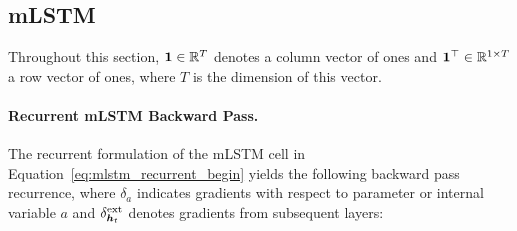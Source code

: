 \documentclass[dvipsnames]{article}
\begin{document}
\begin{appendix}
\subsection{mLSTM}
\label{sec:appmLSTM}

Throughout this section, $\bm{1} \in \mathbb{R}^{T}$ denotes a column vector of ones and $\bm{1}^\top \in \mathbb{R}^{1 \times T}$ a row vector of ones, where $T$ is the dimension of this vector.

\paragraph{Recurrent mLSTM Backward Pass.}
The recurrent formulation of the mLSTM cell in Equation~\ref{eq:mlstm_recurrent_begin} yields the following backward pass recurrence, where $\delta_a$ indicates gradients with respect to parameter or internal variable $a$ and $\delta^\text{ext}_{\bm{h}_t}$ denotes gradients from subsequent layers:




\end{appendix}
\end{document}

